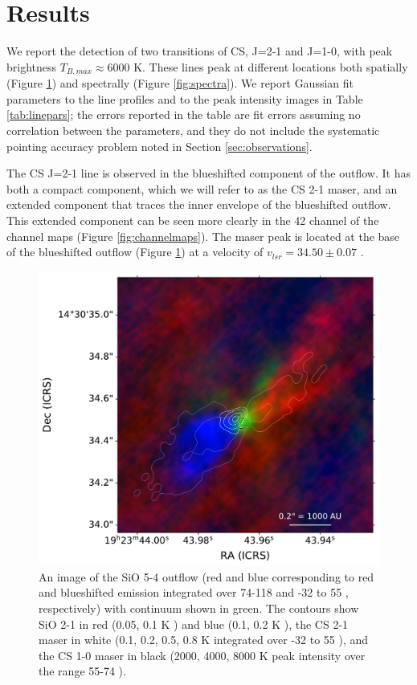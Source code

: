 \documentclass[twocolumn]{aastex62}
\begin{document}
\section{Results}
We report the detection of two transitions of CS, J=2-1 and J=1-0, with
peak brightness $T_{B,max}\approx6000$ K.
These lines peak at different locations both spatially (Figure
\ref{fig:overlay}) and spectrally (Figure \ref{fig:spectra}).
We report Gaussian fit parameters to the line profiles and to the peak intensity
images in Table \ref{tab:linepars}; the errors reported in the table are fit
errors assuming no correlation between the parameters, and they do not include
the systematic pointing accuracy problem noted in Section \ref{sec:observations}.

The CS J=2-1 line is observed in the blueshifted component of the outflow.
It has both a compact component, which we will refer to as the CS 2-1 maser,
and an extended component that traces the inner envelope of the blueshifted
outflow.  This extended component can be seen more clearly in the 42 \kms
channel of the channel maps (Figure \ref{fig:channelmaps}).  The maser
peak is located at the base of the blueshifted outflow (Figure
\ref{fig:overlay}) at a velocity of $v_{lsr}=34.50\pm0.07$ \kms.

\begin{figure}[htp]
    \includegraphics[width=\textwidth]{figures/W51e2e_sio_outflow_with_CS_contours.pdf}
    \caption{An image of the SiO 5-4 outflow (red and blue corresponding to
    red and blueshifted emission integrated over 74-118 \kms and -32 to 55
    \kms, respectively) with continuum shown in green.  The contours show SiO
    2-1 in red (0.05, 0.1 K \kms) and blue (0.1, 0.2 K \kms), the CS 2-1
    maser in white (0.1, 0.2, 0.5, 0.8 K \kms integrated over -32 to 55 \kms),
    and the CS 1-0 maser in black (2000, 4000, 8000 K peak intensity over
    the range 55-74 \kms).  }
    \label{fig:overlay}
\end{figure}
\end{document}

